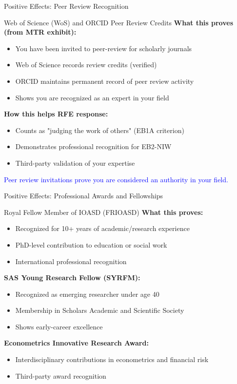 \documentclass[11pt]{beamer}
\begin{document}
	\begin{frame}{Positive Effects: Peer Review Recognition}
		\scriptsize
		\begin{block}{Web of Science (WoS) and ORCID Peer Review Credits}
			\textbf{What this proves (from MTR exhibit):}
			\begin{itemize}
				\item You have been invited to peer-review for scholarly journals
				\item Web of Science records review credits (verified)
				\item ORCID maintains permanent record of peer review activity
				\item Shows you are recognized as an expert in your field
			\end{itemize}
			\textbf{How this helps RFE response:}
			\begin{itemize}
				\item Counts as "judging the work of others" (EB1A criterion)
				\item Demonstrates professional recognition for EB2-NIW
				\item Third-party validation of your expertise
			\end{itemize}
			\textcolor{blue}{Peer review invitations prove you are considered an authority in your field.}
		\end{block}
	\end{frame}
	
	\begin{frame}{Positive Effects: Professional Awards and Fellowships}
		\scriptsize
		\begin{block}{Royal Fellow Member of IOASD (FRIOASD)}
			\textbf{What this proves:}
			\begin{itemize}
				\item Recognized for 10+ years of academic/research experience
				\item PhD-level contribution to education or social work
				\item International professional recognition
			\end{itemize}
			\textbf{SAS Young Research Fellow (SYRFM):}
			\begin{itemize}
				\item Recognized as emerging researcher under age 40
				\item Membership in Scholars Academic and Scientific Society
				\item Shows early-career excellence
			\end{itemize}
			\textbf{Econometrics Innovative Research Award:}
			\begin{itemize}
				\item Interdisciplinary contributions in econometrics and financial risk
				\item Third-party award recognition
			\end{itemize}
		\end{block}
	\end{frame}
	
\end{document}
